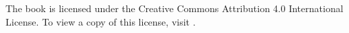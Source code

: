 \noindent\hrulefill

The book is licensed under the Creative Commons Attribution 4.0
International License. To view a copy of this license, visit
.

\noindent\hrulefill

\tableofcontents



\begin{appendices}
  
  
\end{appendices}

\printbibliography

